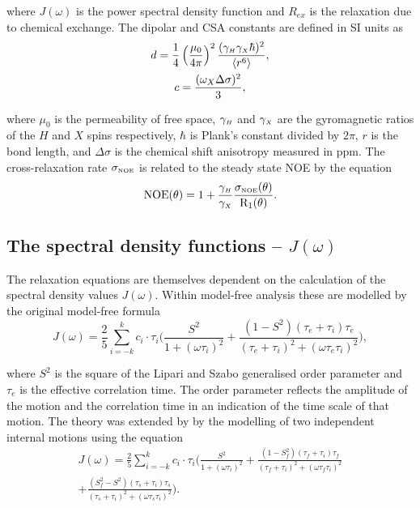 \noindent where $J(\omega)$ is the power spectral density function and $R_{ex}$ is the relaxation due to chemical exchange.
The dipolar and CSA constants are defined in SI units as
\begin{gather}
 d = \frac{1}{4} \left(\frac{\mu_0}{4\pi}\right)^2 \frac{(\gamma_{\scriptscriptstyle H} \gamma_{\scriptscriptstyle X} \hbar)^2}{\langle r^6 \rangle}, \label{eq: dipolar constant} \\
 c = \frac{(\omega_X \Delta\sigma)^2}{3}, \label{eq: CSA constant}
\end{gather}

\noindent where $\mu_0$ is the permeability of free space, $\gamma_{\scriptscriptstyle H}$ and $\gamma_{\scriptscriptstyle X}$ are the gyromagnetic ratios of the $H$ and $X$ spins respectively, $\hbar$ is Plank's constant divided by $2\pi$, $r$ is the bond length, and $\Delta\sigma$ is the chemical shift anisotropy measured in ppm.
The cross-relaxation rate $\sigma_{\scriptscriptstyle \mathrm{NOE}}$ is related to the steady state NOE by the equation
\begin{equation} \label{eq: NOE}
 \mathrm{NOE}(\theta) = 1 + \frac{\gamma_{\scriptscriptstyle H}}{\gamma_{\scriptscriptstyle X}} \frac{\sigma_{\scriptscriptstyle \mathrm{NOE}}(\theta)}{\mathrm{R}_1(\theta)}.
\end{equation}



\subsection{The spectral density functions -- $J(\omega)$}

The relaxation equations are themselves dependent on the calculation of the spectral density values $J(\omega)$.
Within model-free analysis these are modelled by the original model-free formula \citep{LipariSzabo82a, LipariSzabo82b}
\begin{equation} \label{eq: J(w) model-free generic}
    J(\omega) = \frac{2}{5} \sum_{i=-k}^k c_i \cdot \tau_i \Bigg(
        \frac{S^2}{1 + (\omega \tau_i)^2}
        + \frac{(1 - S^2)(\tau_e + \tau_i)\tau_e}{(\tau_e + \tau_i)^2 + (\omega \tau_e \tau_i)^2}
    \Bigg),
\end{equation}

\noindent where $S^2$ is the square of the Lipari and Szabo generalised order parameter and $\tau_e$ is the effective correlation time.
The order parameter reflects the amplitude of the motion and the correlation time in an indication of the time scale of that motion.
The theory was extended by \citet{Clore90a} by the modelling of two independent internal motions using the equation
\begin{multline} \label{eq: J(w) model-free ext generic}
    J(\omega) = \frac{2}{5} \sum_{i=-k}^k c_i \cdot \tau_i \Bigg(
        \frac{S^2}{1 + (\omega \tau_i)^2}
        + \frac{(1 - S^2_f)(\tau_f + \tau_i)\tau_f}{(\tau_f + \tau_i)^2 + (\omega \tau_f \tau_i)^2}       \\
        + \frac{(S^2_f - S^2)(\tau_s + \tau_i)\tau_s}{(\tau_s + \tau_i)^2 + (\omega \tau_s \tau_i)^2}
    \Bigg).
\end{multline}

